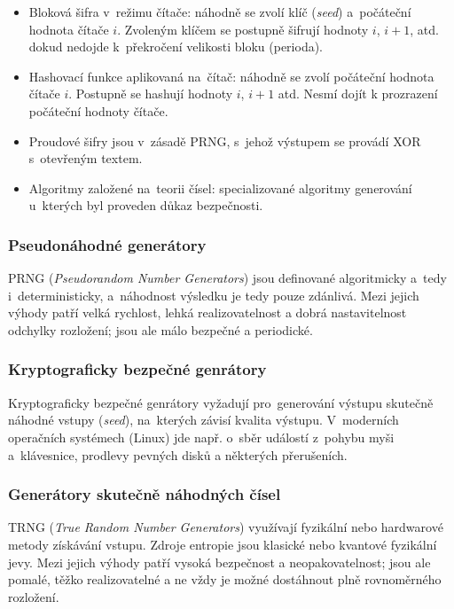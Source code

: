 \begin{itemize}
    \item
        Bloková šifra v~režimu čítače: náhodně se zvolí klíč (\emph{seed}) a~počáteční hodnota čítače $i$.
        Zvoleným klíčem se postupně šifrují hodnoty $i$, $i+1$, atd. dokud nedojde k~překročení velikosti bloku (perioda).
    \item
        Hashovací funkce aplikovaná na~čítač: náhodně se zvolí počáteční hodnota čítače $i$.
        Postupně se hashují hodnoty $i$, $i+1$ atd.
        Nesmí dojít k prozrazení počáteční hodnoty čítače.
    \item
        Proudové šifry jsou v~zásadě PRNG, s~jehož výstupem se provádí XOR s~otevřeným textem.
    \item
        Algoritmy založené na~teorii čísel: specializované algoritmy generování u~kterých byl proveden důkaz bezpečnosti.
\end{itemize}


\subsubsection{Pseudonáhodné generátory}

PRNG (\emph{Pseudorandom Number Generators}) jsou definované algoritmicky a~tedy i~deterministicky, a~náhodnost výsledku je tedy pouze zdánlivá.
Mezi jejich výhody patří velká rychlost, lehká realizovatelnost a dobrá nastavitelnost odchylky rozložení; jsou ale málo bezpečné a periodické.


\subsubsection{Kryptograficky bezpečné genrátory}

Kryptograficky bezpečné genrátory vyžadují pro~generování výstupu skutečně náhodné vstupy (\emph{seed}), na~kterých závisí kvalita výstupu.
V~moderních operačních systémech (Linux) jde např. o~sběr událostí z~pohybu myši a~klávesnice, prodlevy pevných disků a některých přerušeních.


\subsubsection{Generátory skutečně náhodných čísel}

TRNG (\emph{True Random Number Generators}) využívají fyzikální nebo hardwarové metody získávání vstupu.
Zdroje entropie jsou klasické nebo kvantové fyzikální jevy.
Mezi jejich výhody patří vysoká bezpečnost a neopakovatelnost; jsou ale pomalé, těžko realizovatelné a ne vždy je možné dostáhnout plně rovnoměrného rozložení.


